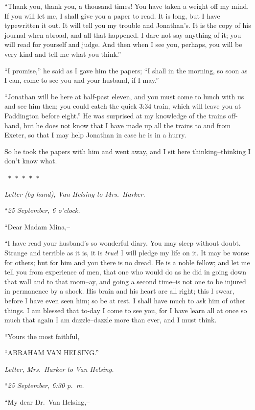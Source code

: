 \documentclass[12pt,openright]{book}
\begin{document}
“Thank you, thank you, a thousand times! You have taken a weight off my mind. If you will let me, I shall give you a paper to read. It is long, but I have typewritten it out. It will tell you my trouble and Jonathan’s. It is the copy of his journal when abroad, and all that happened. I dare not say anything of it; you will read for yourself and judge. And then when I see you, perhaps, you will be very kind and tell me what you think.”

“I promise,” he said as I gave him the papers; “I shall in the morning, so soon as I can, come to see you and your husband, if I may.”

“Jonathan will be here at half-past eleven, and you must come to lunch with us and see him then; you could catch the quick 3:34 train, which will leave you at Paddington before eight.” He was surprised at my knowledge of the trains off-hand, but he does not know that I have made up all the trains to and from Exeter, so that I may help Jonathan in case he is in a hurry.

So he took the papers with him and went away, and I sit here thinking–thinking I don’t know what.

\texttt{   *       *       *       *       *}

\textit{Letter (by hand), Van Helsing to Mrs. Harker.}

“\textit{25 September, 6 o’clock.}

“Dear Madam Mina,–

“I have read your husband’s so wonderful diary. You may sleep without doubt. Strange and terrible as it is, it is \textit{true}! I will pledge my life on it. It may be worse for others; but for him and you there is no dread. He is a noble fellow; and let me tell you from experience of men, that one who would do as he did in going down that wall and to that room–ay, and going a second time–is not one to be injured in permanence by a shock. His brain and his heart are all right; this I swear, before I have even seen him; so be at rest. I shall have much to ask him of other things. I am blessed that to-day I come to see you, for I have learn all at once so much that again I am dazzle–dazzle more than ever, and I must think.

“Yours the most faithful,

“ABRAHAM VAN HELSING.”

\textit{Letter, Mrs. Harker to Van Helsing.}

“\textit{25 September, 6:30 p. m.}

“My dear Dr. Van Helsing,–
\end{document}
